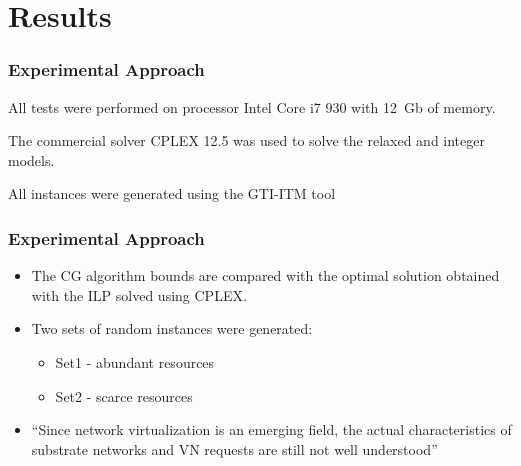 \documentclass[english]{beamer}
\begin{document}
\section{Results}

\begin{frame}
\frametitle{Experimental Approach}
All tests were performed on processor Intel Core i7 930 with 12~Gb of memory. 

The commercial solver CPLEX 12.5 was used to solve the relaxed and integer models. 

All instances were generated using the GTI-ITM tool
\end{frame}

\begin{frame}
\frametitle{Experimental Approach}
\begin{itemize}
  \item The CG algorithm bounds are compared with the optimal solution obtained with the ILP solved using CPLEX.

  \item Two sets of random instances were generated:
    \begin{itemize}
      \item Set1 - abundant resources
      \item Set2 - scarce resources
    \end{itemize}

  \item ``Since network virtualization is an emerging field, the actual characteristics of substrate networks and VN requests are still not well understood''
\cite{Chowdhury2010}

\end{itemize}
\end{frame}
\end{document}
